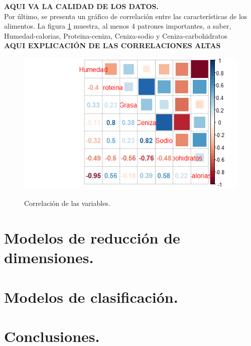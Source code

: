 \documentclass[12pt, letterpaper]{article}
\begin{document}
\textbf{AQUI VA LA CALIDAD DE LOS DATOS.}\\

Por último, se presenta un gráfico de correlación entre las características de los alimentos. La figura \ref{i11} muestra, al menos 4 patrones importantes, a saber, Humedad-calorias, Proteina-ceniza, Ceniza-sodio y Ceniza-carbohidratos\\

\textbf{AQUI EXPLICACIÓN DE LAS CORRELACIONES ALTAS}

\begin{figure}[h]
\centering
\includegraphics[scale=1]{images/corr.png} 
\label{i11}
\caption{Correlación de las variables.}
\end{figure}


\section{Modelos de reducción de dimensiones.}

\section{Modelos de clasificación.}

\section{Conclusiones.}
\end{document}
